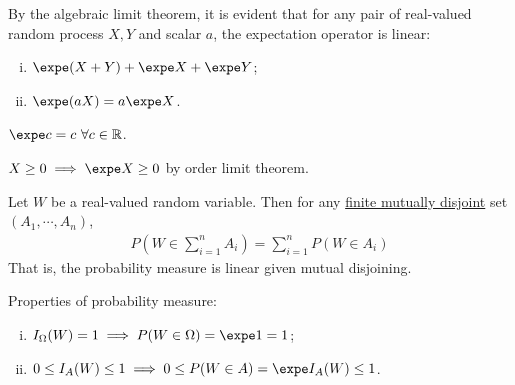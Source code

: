 \documentclass{article}
\begin{document}
   	\begin{theorem}
   		By the algebraic limit theorem, it is evident that for any pair of real-valued random process $X, Y$ and scalar $a$, the expectation operator is linear:
   		\begin{enumerate}[(i)]
   			\item $\expe (X+Y) + \expe X + \expe Y$;
   			\item $\expe (aX) = a \expe X$.
   		\end{enumerate}
   	\end{theorem}
   	
   	\begin{proposition}
   		$\expe c = c\ \forall c \in \R$.
   	\end{proposition}
   	
   	\begin{proposition}
   		$X \geq 0 \implies \expe X \geq 0$ by order limit theorem.
   	\end{proposition}
   	
   	\begin{theorem}
   		Let $W$ be a real-valued random variable. Then for any \ul{finite mutually disjoint} set $(A_1, \cdots, A_n)$, 
   		\begin{align}
   			P(W \in \sum_{i=1}^n A_i) = \sum_{i=1}^n P(W \in A_i)
   		\end{align}
   		That is, the probability measure is linear given mutual disjoining.
   	\end{theorem}
   	
   	\begin{proposition}
   		Properties of probability measure:
   		\begin{enumerate}[(i)]
   			\item $I_\Omega(W) = 1 \implies P(W \in \Omega) = \expe 1 = 1$;
   			\item $0 \leq I_A(W) \leq 1 \implies 0 \leq P(W \in A) = \expe I_A(W) \leq 1$.
   		\end{enumerate}
   	\end{proposition}
   	
   	
\end{document}
